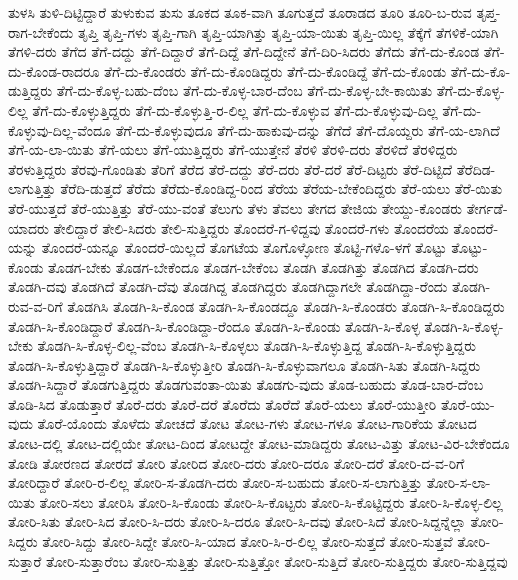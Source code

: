 {ತುಳಸಿ
ತುಳಿ-ದಿಟ್ಟಿದ್ದಾರೆ
ತುಳುಕುವ
ತುಸು
ತೂಕದ
ತೂಕ-ವಾಗಿ
ತೂಗುತ್ತದೆ
ತೂರಾಡದ
ತೂರಿ
ತೂರಿ-ಬ-ರುವ
ತೃಪ್ತ-ರಾಗ-ಬೇಕೆಂದು
ತೃಪ್ತಿ
ತೃಪ್ತಿ-ಗಳು
ತೃಪ್ತಿ-ಗಾಗಿ
ತೃಪ್ತಿ-ಯಾಗಿತ್ತು
ತೃಪ್ತಿ-ಯಾ-ಯಿತು
ತೃಪ್ತಿ-ಯಿಲ್ಲ
ತೆಕ್ಕೆಗೆ
ತೆಗಳಿಕೆ-ಯಾಗಿ
ತೆಗಳಿ-ದರು
ತೆಗೆದ
ತೆಗೆ-ದದ್ದು
ತೆಗೆ-ದಿದ್ದಾರೆ
ತೆಗೆ-ದಿದ್ದೆ
ತೆಗೆ-ದಿದ್ದೇನೆ
ತೆಗೆ-ದಿರಿ-ಸಿದರು
ತೆಗೆದು
ತೆಗೆ-ದು-ಕೊಂಡ
ತೆಗೆ-ದು-ಕೊಂಡ-ರಾದರೂ
ತೆಗೆ-ದು-ಕೊಂಡರು
ತೆಗೆ-ದು-ಕೊಂಡಿದ್ದರು
ತೆಗೆ-ದು-ಕೊಂಡಿದ್ದೆ
ತೆಗೆ-ದು-ಕೊಂಡು
ತೆಗೆ-ದು-ಕೊ-ಡುತ್ತಿದ್ದರು
ತೆಗೆ-ದು-ಕೊಳ್ಳ-ಬಹು-ದೆಂಬ
ತೆಗೆ-ದು-ಕೊಳ್ಳ-ಬಾರ-ದೆಂಬ
ತೆಗೆ-ದು-ಕೊಳ್ಳ-ಬೇ-ಕಾಯಿತು
ತೆಗೆ-ದು-ಕೊಳ್ಳ-ಲಿಲ್ಲ
ತೆಗೆ-ದು-ಕೊಳ್ಳುತ್ತಿದ್ದರು
ತೆಗೆ-ದು-ಕೊಳ್ಳುತ್ತಿ-ರ-ಲಿಲ್ಲ
ತೆಗೆ-ದು-ಕೊಳ್ಳುವ
ತೆಗೆ-ದು-ಕೊಳ್ಳುವು-ದಿಲ್ಲ
ತೆಗೆ-ದು-ಕೊಳ್ಳುವು-ದಿಲ್ಲ-ವೆಂದೂ
ತೆಗೆ-ದು-ಕೊಳ್ಳುವುದೂ
ತೆಗೆ-ದು-ಹಾಕುವು-ದನ್ನು
ತೆಗೆದೆ
ತೆಗೆ-ದೊಯ್ದರು
ತೆಗೆ-ಯ-ಲಾಗಿದೆ
ತೆಗೆ-ಯ-ಲಾ-ಯಿತು
ತೆಗೆ-ಯಲು
ತೆಗೆ-ಯುತ್ತಿದ್ದರು
ತೆಗೆ-ಯುತ್ತೇನೆ
ತೆರಳಿ
ತೆರಳಿ-ದರು
ತೆರಳಿದೆ
ತೆರಳಿದ್ದರು
ತೆರಳುತ್ತಿದ್ದರು
ತೆರವು-ಗೊಂಡಿತು
ತೆರಿಗೆ
ತೆರೆದ
ತೆರೆ-ದದ್ದು
ತೆರೆ-ದರು
ತೆರೆ-ದರೆ
ತೆರೆ-ದಿಟ್ಟರು
ತೆರೆ-ದಿಟ್ಟಿದೆ
ತೆರೆದಿಡ-ಲಾಗುತ್ತಿತ್ತು
ತೆರೆದಿ-ಡುತ್ತದೆ
ತೆರೆದು
ತೆರೆದು-ಕೊಂಡಿದ್ದ-ರಿಂದ
ತೆರೆಯ
ತೆರೆಯ-ಬೇಕೆಂದಿದ್ದರು
ತೆರೆ-ಯಲು
ತೆರೆ-ಯಿತು
ತೆರೆ-ಯುತ್ತದೆ
ತೆರೆ-ಯುತ್ತಿತ್ತು
ತೆರೆ-ಯು-ವಂತೆ
ತೆಲುಗು
ತೆಳು
ತೆವಲು
ತೇಗದ
ತೇಜಿಯ
ತೇಯ್ದು-ಕೊಂಡರು
ತೇರ್ಗಡೆ-ಯಾದರು
ತೇಲಿದ್ದಾರೆ
ತೇಲಿ-ಸಿದರು
ತೇಲಿ-ಸುತ್ತಿದ್ದರು
ತೊಂದರೆ-ಗ-ಳಿದ್ದವು
ತೊಂದರೆ-ಗಳು
ತೊಂದರೆಯ
ತೊಂದರೆ-ಯನ್ನು
ತೊಂದರೆ-ಯನ್ನೂ
ತೊಂದರೆ-ಯಿಲ್ಲದೆ
ತೊಗಟೆಯ
ತೊಗೊಳ್ಳೋಣ
ತೊಟ್ಟಿ-ಗಳೊ-ಳಗೆ
ತೊಟ್ಟು
ತೊಟ್ಟು-ಕೊಂಡು
ತೊಡಗ-ಬೇಕು
ತೊಡಗ-ಬೇಕೆಂದೂ
ತೊಡಗ-ಬೇಕೆಂಬ
ತೊಡಗಿ
ತೊಡಗಿತ್ತು
ತೊಡಗಿದ
ತೊಡಗಿ-ದರು
ತೊಡಗಿ-ದವು
ತೊಡಗಿದೆ
ತೊಡಗಿ-ದೆವು
ತೊಡಗಿದ್ದ
ತೊಡಗಿದ್ದರು
ತೊಡಗಿದ್ದಾಗಲೇ
ತೊಡಗಿದ್ದಾ-ರೆಂದು
ತೊಡಗಿ-ರುವ-ವ-ರಿಗೆ
ತೊಡಗಿಸಿ
ತೊಡಗಿ-ಸಿ-ಕೊಂಡ
ತೊಡಗಿ-ಸಿ-ಕೊಂಡದ್ದೂ
ತೊಡಗಿ-ಸಿ-ಕೊಂಡರು
ತೊಡಗಿ-ಸಿ-ಕೊಂಡಿದ್ದರು
ತೊಡಗಿ-ಸಿ-ಕೊಂಡಿದ್ದಾರೆ
ತೊಡಗಿ-ಸಿ-ಕೊಂಡಿದ್ದಾ-ರೆಂದೂ
ತೊಡಗಿ-ಸಿ-ಕೊಂಡು
ತೊಡಗಿ-ಸಿ-ಕೊಳ್ಳ
ತೊಡಗಿ-ಸಿ-ಕೊಳ್ಳ-ಬೇಕು
ತೊಡಗಿ-ಸಿ-ಕೊಳ್ಳ-ಲಿಲ್ಲ-ವೆಂಬ
ತೊಡಗಿ-ಸಿ-ಕೊಳ್ಳಲು
ತೊಡಗಿ-ಸಿ-ಕೊಳ್ಳುತ್ತಿದ್ದ
ತೊಡಗಿ-ಸಿ-ಕೊಳ್ಳುತ್ತಿದ್ದರು
ತೊಡಗಿ-ಸಿ-ಕೊಳ್ಳುತ್ತಿದ್ದಾರೆ
ತೊಡಗಿ-ಸಿ-ಕೊಳ್ಳುತ್ತೀರಿ
ತೊಡಗಿ-ಸಿ-ಕೊಳ್ಳುವಾಗಲೂ
ತೊಡಗಿ-ಸಿತು
ತೊಡಗಿ-ಸಿದ್ದರು
ತೊಡಗಿ-ಸಿದ್ದಾರೆ
ತೊಡಗುತ್ತಿದ್ದರು
ತೊಡಗುವಂತಾ-ಯಿತು
ತೊಡಗು-ವುದು
ತೊಡ-ಬಹುದು
ತೊಡ-ಬಾರ-ದೆಂಬ
ತೊಡಿ-ಸಿದ
ತೊಡುತ್ತಾರೆ
ತೊರೆ-ದರು
ತೊರೆ-ದರೆ
ತೊರೆದು
ತೊರೆದೆ
ತೊರೆ-ಯಲು
ತೊರೆ-ಯುತ್ತೀರಿ
ತೊರೆ-ಯು-ವುದು
ತೊರೆ-ಯೊಂದು
ತೊಳೆದು
ತೋಚದೆ
ತೋಟ
ತೋಟ-ಗಳು
ತೋಟ-ಗಳೂ
ತೋಟ-ಗಾರಿಕೆಯ
ತೋಟದ
ತೋಟ-ದಲ್ಲಿ
ತೋಟ-ದಲ್ಲಿಯೇ
ತೋಟ-ದಿಂದ
ತೋಟದ್ದೇ
ತೋಟ-ಮಾಡಿದ್ದರು
ತೋಟ-ವಿತ್ತು
ತೋಟ-ವಿರ-ಬೇಕೆಂದೂ
ತೋಡಿ
ತೋರಣದ
ತೋರದೆ
ತೋರಿ
ತೋರಿದ
ತೋರಿ-ದರು
ತೋರಿ-ದರೂ
ತೋರಿ-ದರೆ
ತೋರಿ-ದ-ವ-ರಿಗೆ
ತೋರಿದ್ದಾರೆ
ತೋರಿ-ರ-ಲಿಲ್ಲ
ತೋರಿ-ಸ-ತೊಡಗಿ-ದರು
ತೋರಿ-ಸ-ಬಹುದು
ತೋರಿ-ಸ-ಲಾಗುತ್ತಿತ್ತು
ತೋರಿ-ಸ-ಲಾ-ಯಿತು
ತೋರಿ-ಸಲು
ತೋರಿಸಿ
ತೋರಿ-ಸಿ-ಕೊಂಡು
ತೋರಿ-ಸಿ-ಕೊಟ್ಟರು
ತೋರಿ-ಸಿ-ಕೊಟ್ಟಿದ್ದರು
ತೋರಿ-ಸಿ-ಕೊಳ್ಳ-ಲಿಲ್ಲ
ತೋರಿ-ಸಿತು
ತೋರಿ-ಸಿದ
ತೋರಿ-ಸಿ-ದರು
ತೋರಿ-ಸಿ-ದರೂ
ತೋರಿ-ಸಿ-ದವು
ತೋರಿ-ಸಿದೆ
ತೋರಿ-ಸಿದ್ದನ್ನೆಲ್ಲಾ
ತೋರಿ-ಸಿದ್ದರು
ತೋರಿ-ಸಿದ್ದು
ತೋರಿ-ಸಿದ್ದೇ
ತೋರಿ-ಸಿ-ಯಾದ
ತೋರಿ-ಸಿ-ರ-ಲಿಲ್ಲ
ತೋರಿ-ಸುತ್ತದೆ
ತೋರಿ-ಸುತ್ತವೆ
ತೋರಿ-ಸುತ್ತಾರೆ
ತೋರಿ-ಸುತ್ತಾರೆಂಬ
ತೋರಿ-ಸುತ್ತಿತ್ತು
ತೋರಿ-ಸುತ್ತಿತ್ತೋ
ತೋರಿ-ಸುತ್ತಿದೆ
ತೋರಿ-ಸುತ್ತಿದ್ದರು
ತೋರಿ-ಸುತ್ತಿದ್ದವು
}
